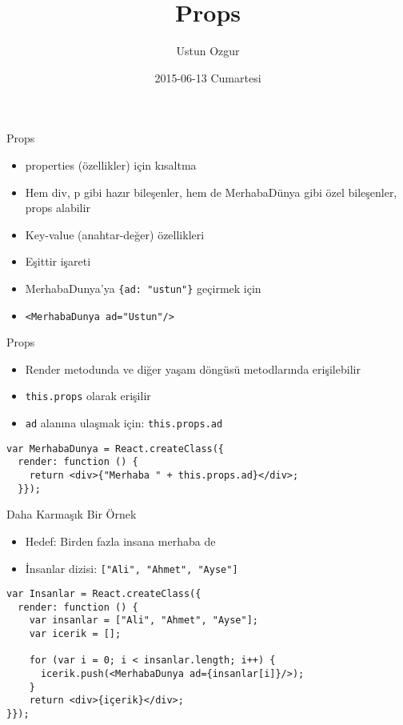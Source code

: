 \documentclass[presentation]{beamer}
\author{Ustun Ozgur}
\date{2015-06-13 Cumartesi}
\title{Props}
\begin{document}
\maketitle

\begin{frame}[fragile,label=sec-1]{Props}
 \begin{itemize}
\item properties (özellikler) için kısaltma
\item Hem div, p gibi hazır bileşenler, hem de MerhabaDünya gibi özel bileşenler,
props alabilir
\item Key-value (anahtar-değer) özellikleri
\item Eşittir işareti
\item MerhabaDunya'ya \texttt{\{ad: "ustun"\}} geçirmek için
\item \verb~<MerhabaDunya ad="Ustun"/>~
\end{itemize}
\end{frame}

\begin{frame}[fragile,label=sec-2]{Props}
 \begin{itemize}
\item Render metodunda ve diğer yaşam döngüsü metodlarında erişilebilir
\item \texttt{this.props} olarak erişilir
\item \texttt{ad} alanına ulaşmak için: \texttt{this.props.ad}
\end{itemize}
\begin{verbatim}
var MerhabaDunya = React.createClass({
  render: function () {
    return <div>{"Merhaba " + this.props.ad}</div>;
  }});
\end{verbatim}
\end{frame}


\begin{frame}[fragile,label=sec-3]{Daha Karmaşık Bir Örnek}
 \begin{itemize}
\item Hedef: Birden fazla insana merhaba de
\item İnsanlar dizisi: \texttt{["Ali", "Ahmet", "Ayse"]}
\end{itemize}

\begin{verbatim}
var Insanlar = React.createClass({
  render: function () {
    var insanlar = ["Ali", "Ahmet", "Ayse"];
    var icerik = [];

    for (var i = 0; i < insanlar.length; i++) {
      icerik.push(<MerhabaDunya ad={insanlar[i]}/>);
    }
    return <div>{içerik}</div>;
}});
\end{verbatim}
\end{frame}
\end{document}
